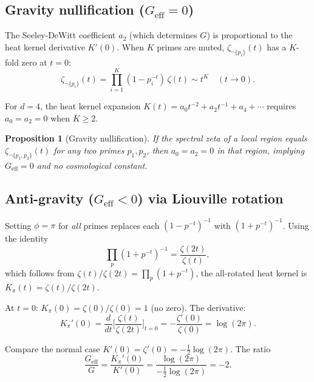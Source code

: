 \documentclass[aps,prd,twocolumn,superscriptaddress,nofootinbib]{revtex4-2}
\newtheorem{proposition}[theorem]{Proposition}
\begin{document}
\subsection{Gravity nullification ($G_{\mathrm{eff}} = 0$)}

The Seeley-DeWitt coefficient $a_2$ (which determines $G$) is
proportional to the heat kernel derivative $K'(0)$.
When $K$ primes are muted, $\zeta_{\neg\{p_i\}}(t)$ has a $K$-fold
zero at $t = 0$:
\begin{equation}
  \zeta_{\neg\{p_i\}}(t) = \prod_{i=1}^K (1 - p_i^{-t}) \, \zeta(t)
  \sim t^K \quad (t \to 0).
\end{equation}

For $d = 4$, the heat kernel expansion
$K(t) = a_0 t^{-2} + a_2 t^{-1} + a_4 + \cdots$
requires $a_0 = a_2 = 0$ when $K \geq 2$.

\begin{proposition}[Gravity nullification]
If the spectral zeta of a local region equals
$\zeta_{\neg\{p_1, p_2\}}(t)$ for any two primes $p_1, p_2$,
then $a_0 = a_2 = 0$ in that region, implying
$G_{\mathrm{eff}} = 0$ and no cosmological constant.
\end{proposition}

\subsection{Anti-gravity ($G_{\mathrm{eff}} < 0$) via Liouville rotation}

Setting $\phi = \pi$ for \emph{all} primes replaces each
$(1 - p^{-t})^{-1}$ with $(1 + p^{-t})^{-1}$.
Using the identity
\begin{equation}
  \prod_p (1 + p^{-t})^{-1} = \frac{\zeta(2t)}{\zeta(t)},
  \label{eq:liouville}
\end{equation}
which follows from $\zeta(t)/\zeta(2t) = \prod_p (1 + p^{-t})$,
the all-rotated heat kernel is $K_\pi(t) = \zeta(t)/\zeta(2t)$.

At $t = 0$: $K_\pi(0) = \zeta(0)/\zeta(0) = 1$ (no zero).
The derivative:
\begin{equation}
  K_\pi'(0) = \frac{d}{dt}\biggl[\frac{\zeta(t)}{\zeta(2t)}\biggr]_{t=0}
  = -\frac{\zeta'(0)}{\zeta(0)} = \log(2\pi).
\end{equation}

Compare the normal case $K'(0) = \zeta'(0) = -\tfrac{1}{2}\log(2\pi)$.
The ratio
\begin{equation}
  \frac{G_{\mathrm{eff}}}{G} = \frac{K_\pi'(0)}{K'(0)}
  = \frac{\log(2\pi)}{-\tfrac{1}{2}\log(2\pi)} = -2.
\end{equation}
\end{document}
